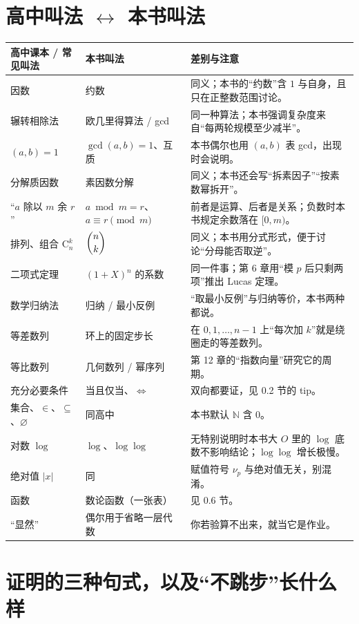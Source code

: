 \documentclass[UTF8,a4paper,11pt,oneside,openany,fontset=fandol]{ctexbook}
\theoremstyle{definition}
\newcommand{\N}{\mathbb N}
\begin{document}
\section{高中叫法 $\leftrightarrow$ 本书叫法}
\begin{longtable}{>{\raggedright\arraybackslash}p{}>{\raggedright\arraybackslash}p{}>{\raggedright\arraybackslash}p{}}
\toprule
高中课本 / 常见叫法 & 本书叫法 & 差别与注意\\\midrule
因数 & 约数 & 同义；本书的“约数”含 $1$ 与自身，且只在正整数范围讨论。\\
辗转相除法 & 欧几里得算法 / gcd & 同一种算法；本书强调复杂度来自“每两轮规模至少减半”。\\
$(a,b)=1$ & $\gcd(a,b)=1$、互质 & 本书偶尔也用 $(a,b)$ 表 gcd，出现时会说明。\\
分解质因数 & 素因数分解 & 同义；本书还会写“拆素因子”“按素数幂拆开”。\\
“$a$ 除以 $m$ 余 $r$” & $a\bmod m=r$、$a\equiv r\pmod m$ & 前者是运算、后者是关系；负数时本书规定余数落在 $[0,m)$。\\
排列、组合 $\mathrm{C}_n^k$ & $\dbinom{n}{k}$ & 同义；本书用分式形式，便于讨论“分母能否取逆”。\\
二项式定理 & $(1+X)^n$ 的系数 & 同一件事；第 6 章用“模 $p$ 后只剩两项”推出 Lucas 定理。\\
数学归纳法 & 归纳 / 最小反例 & “取最小反例”与归纳等价，本书两种都说。\\
等差数列 & 环上的固定步长 & 在 $0,1,\ldots,n-1$ 上“每次加 $k$”就是绕圈走的等差数列。\\
等比数列 & 几何数列 / 幂序列 & 第 12 章的“指数向量”研究它的周期。\\
充分必要条件 & 当且仅当、$\iff$ & 双向都要证，见 0.2 节的 tip。\\
集合、$\in$、$\subseteq$、$\varnothing$ & 同高中 & 本书默认 $\N$ 含 $0$。\\
对数 $\log$ & $\log$、$\log\log$ & 无特别说明时本书大 $O$ 里的 $\log$ 底数不影响结论；$\log\log$ 增长极慢。\\
绝对值 $|x|$ & 同 & 赋值符号 $\nu_p$ 与绝对值无关，别混淆。\\
函数 & 数论函数（一张表） & 见 0.6 节。\\
“显然” & 偶尔用于省略一层代数 & 你若验算不出来，就当它是作业。\\
\bottomrule
\end{longtable}

\section{证明的三种句式，以及“不跳步”长什么样}
\end{document}
